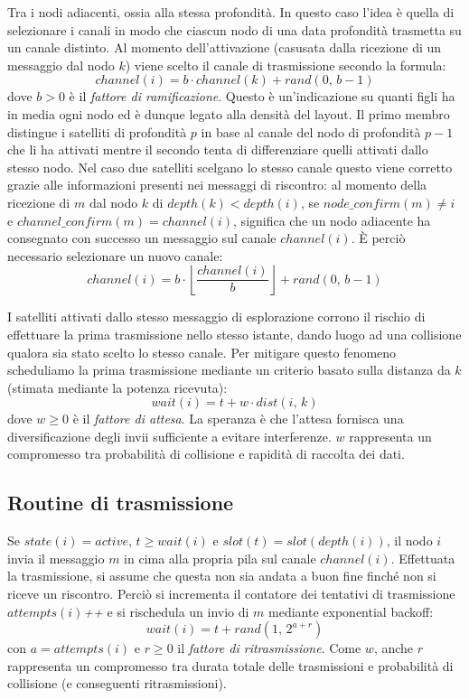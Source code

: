 \documentclass[a4paper,12pt]{article}
\theoremstyle{definition}
\begin{document}
Tra i nodi adiacenti, ossia alla stessa profondità. In questo caso l'idea è quella di selezionare i canali in modo che ciascun nodo di una data profondità trasmetta su un canale distinto. Al momento dell'attivazione (casusata dalla ricezione di un messaggio dal nodo $k$) viene scelto il canale di trasmissione secondo la formula:
\begin{equation*}
channel(i) = b \cdot channel(k) + rand(0,\,b-1)
\end{equation*}
dove $b > 0$ è il \emph{fattore di ramificazione}. Questo è un'indicazione su quanti figli ha in media ogni nodo ed è dunque legato alla densità del layout. Il primo membro distingue i satelliti di profondità $p$ in base al canale del nodo di profondità $p-1$ che li ha attivati mentre il secondo tenta di differenziare quelli attivati dallo stesso nodo. Nel caso due satelliti scelgano lo stesso canale questo viene corretto grazie alle informazioni presenti nei messaggi di riscontro: al momento della ricezione di $m$ dal nodo $k$ di $depth(k) < depth(i)$, se $node\_confirm(m) \neq i$ e $channel\_confirm(m) = channel(i)$, significa che un nodo adiacente ha consegnato con successo un messaggio sul canale $channel(i)$. È perciò necessario selezionare un nuovo canale:
\begin{equation*}
channel(i) = b \cdot \left\lfloor\frac{channel(i)}{b}\right\rfloor + rand(0,\,b-1)
\end{equation*}

I satelliti attivati dallo stesso messaggio di esplorazione corrono il rischio di effettuare la prima trasmissione nello stesso istante, dando luogo ad una collisione qualora sia stato scelto lo stesso canale. Per mitigare questo fenomeno scheduliamo la prima trasmissione mediante un criterio basato sulla distanza da $k$ (stimata mediante la potenza ricevuta):
\begin{equation*}
wait(i) = t + w \cdot dist(i,\,k)
\end{equation*}
dove $w \geq 0$ è il \emph{fattore di attesa}. La speranza è che l'attesa fornisca una diversificazione degli invii sufficiente a evitare interferenze. $w$ rappresenta un compromesso tra probabilità di collisione e rapidità di raccolta dei dati.

\subsection{Routine di trasmissione}

Se $state(i) = active$, $t \geq wait(i)$ e $slot(t) = slot(depth(i))$, il nodo $i$ invia il messaggio $m$ in cima alla propria pila sul canale $channel(i)$. Effettuata la trasmissione, si assume che questa non sia andata a buon fine finché non si riceve un riscontro. Perciò si incrementa il contatore dei tentativi di trasmissione $attempts(i)$\textit{++} e si rischedula un invio di $m$ mediante exponential backoff:
\begin{equation*}
wait(i) = t + rand(1,\,2^{a+r})
\end{equation*}
con $a = attempts(i)$ e $r \geq 0$ il \emph{fattore di ritrasmissione}. Come $w$, anche $r$ rappresenta un compromesso tra durata totale delle trasmissioni e probabilità di collisione (e conseguenti ritrasmissioni).
\end{document}
